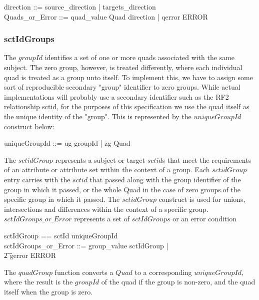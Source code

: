 \documentclass{article}
\begin{document}
\begin{zed}
direction ::= source\_direction | targets\_direction \\
Quads\_or\_Error ::= quad\_value \ldata \power Quad \cross direction \rdata | qerror \ldata ERROR \rdata
\end{zed}

\subsubsection{sctIdGroups}
The $groupId$ identifies a set of one or more quads associated with the same subject.  The zero group, however, is treated differently,
where each individual quad is treated as a group unto itself.  To implement this, we have to assign some sort of reproducible secondary "group" identifier to zero
groups.  While actual implementations will probably use a secondary identifier such as the RF2 relationship sctid, for the purposes of this specification we use
the quad itself as the unique identity of the "group".  This is represented by the $uniqueGroupId$ construct below:

\begin{zed}
uniqueGroupId ::= ug \ldata groupId \rdata  | zg \ldata Quad \rdata
\end{zed}


The $sctidGroup$ represents a subject or target $sctid$s that meet the requirements of an attribute or attribute set within the context of a group.  Each $sctidGroup$ entry carries
with the $sctid$ that passed along with the group identifier of the group in which it passed, or the whole Quad in the case of zero groups.of the specific group in which it passed. The $sctidGroup$ construct
is used for unions, intersections and differences within the context of a specific group. \\

\noindent
$sctIdGroups\_or\_Error$ represents a set of $sctIdGroups$ or an error condition

\begin{zed}
sctIdGroup == sctId \cross uniqueGroupId \\
sctIdGroups\_or\_Error ::= group\_value \ldata \power sctIdGroup \rdata | \\
\t2 gerror \ldata ERROR \rdata
\end{zed}

The $quadGroup$ function converts a $Quad$ to a corresponding $uniqueGroupId$, where the result is the $groupId$ of the quad if the group is non-zero, and the quad itself
when the group is zero.
\end{document}
